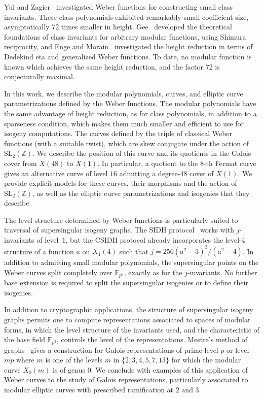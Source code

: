 \documentclass{amsart}
\newcommand{\FF}{\mathbb{F}}
\newcommand{\QQ}{\mathbb{Q}}
\newcommand{\ZZ}{\mathbb{Z}}
\newcommand{\SL}{\mathrm{SL}}
\begin{document}
Yui and Zagier~\cite{YuiZagier97} investigated Weber functions for
constructing small class invariants. These class polynomials exhibited
remarkably small coefficient size, asymptotically 72 times smaller
in height.
Gee~\cite{Gee99} developed the theoretical foundations of class invariants
for arbitrary modular functions, using Shimura reciprocity, and Enge and
Morain~\cite{EngeMorain02,EngeMorain09} investigated the height reduction
in terms of Dedekind eta and generalized Weber functions.
To date, no modular function is known which achieves the same height reduction,
and the factor 72 is conjecturally maximal.

In this work, we describe the modular polynomials, curves, and elliptic
curve parametrizations defined by the Weber functions.
The modular polynomials have the same advantage of height reduction,
as for class polynomials, in addition to a sparseness condition,
which makes them much smaller and efficient to use for isogeny computations. 
The curves defined by the triple of classical Weber functions (with a
suitable twist), which are skew conjugate under the action of $\SL_2(\ZZ)$.
We describe the position of this curve and its quotients in the Galois
cover from $X(48)$ to $X(1)$.
In particular, a quotient to the $8$-th Fermat curve gives an alternative
curve of level $16$ admitting a degree-$48$ cover of $X(1)$.
We provide explicit models for these curves, their morphisms and the
action of $\SL_2(\ZZ)$, as well as the elliptic curve parametrizations
and isogenies that they describe.

The level structure determined by Weber functions is particularly suited
to traversal of supersingular isogeny graphs.
The SIDH protocol~\cite{DeFeoJao} works with $j$-invariants of level~$1$,
but the CSIDH protocol already incorporates the level-$4$ structure of
a function $a$ on $X_1(4)$ such that $j = 256(a^2-3)^3/(a^2-4)$.
In addition to admitting small modular polynomials, the supersingular
points on the Weber curves split completely over $\FF_{p^2}$, exactly
as for the $j$-invariants.  No further base extension is required to
split the supersingular isogenies or to define their isogenies.

In addition to cryptographic applications, the structure of supersingular
isogeny graphs permits one to compute representations associated to spaces
of modular forms, in which the level structure of the invariants used,
and the characteristic of the base field $\FF_{p^2}$, controls the level
of the representations.
Mestre's method of graphs~\cite{Mestre86} gives a construction for Galois
representations of prime level $p$ or level $m p$ where $m$ is one
of the levels $m$ in $\{2,3,4,5,7,13\}$ for which the modular curve 
$X_0(m)$ is of genus $0$.  We conclude with examples of this application
of Weber curves to the study of Galois representations, particularly
associated to modular elliptic curves with prescribed ramification
at $2$ and $3$.
\end{document}
